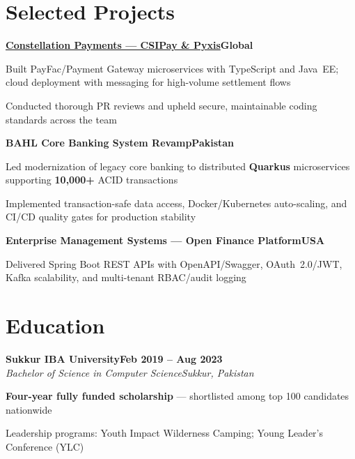 \documentclass[letterpaper,10pt]{article}
\newcommand{\heading}[2]{
  \hspace{8pt}#1\hfill#2\\
}
\newcommand{\headingBf}[2]{
  \heading{\textbf{#1}}{\textbf{#2}}
}
\newcommand{\headingIt}[2]{
  \heading{\textit{#1}}{\textit{#2}}
}
\newenvironment{resume_list}{
  \vspace{-6pt}
  \begin{itemize}[itemsep=-1px, parsep=0.5pt, topsep=1pt, leftmargin=22pt]
}{
  \end{itemize}
  \vspace{-2pt}
}
\begin{document}
\section{Selected Projects}

\headingBf{\href{https://www.constellationpayments.com/}{Constellation Payments --- CSIPay \& Pyxis}}{Global}
\begin{resume_list}
  \item Built PayFac/Payment Gateway microservices with TypeScript and Java~EE; cloud deployment with messaging for high-volume settlement flows
  \item Conducted thorough PR reviews and upheld secure, maintainable coding standards across the team
\end{resume_list}

\vspace{2pt}
\headingBf{BAHL Core Banking System Revamp}{Pakistan}
\begin{resume_list}
  \item Led modernization of legacy core banking to distributed \textbf{Quarkus} microservices supporting \textbf{10,000+} ACID transactions
  \item Implemented transaction-safe data access, Docker/Kubernetes auto-scaling, and CI/CD quality gates for production stability
\end{resume_list}

\vspace{2pt}
\headingBf{Enterprise Management Systems --- Open Finance Platform}{USA}
\begin{resume_list}
  \item Delivered Spring Boot REST APIs with OpenAPI/Swagger, OAuth~2.0/JWT, Kafka scalability, and multi-tenant RBAC/audit logging
\end{resume_list}

\section{Education}
\headingBf{Sukkur IBA University}{Feb 2019 -- Aug 2023}
\headingIt{Bachelor of Science in Computer Science}{Sukkur, Pakistan}
\begin{resume_list}
  \item \textbf{Four-year fully funded scholarship} --- shortlisted among top 100 candidates nationwide
  \item Leadership programs: Youth Impact Wilderness Camping; Young Leader's Conference (YLC)
\end{resume_list}
\end{document}
